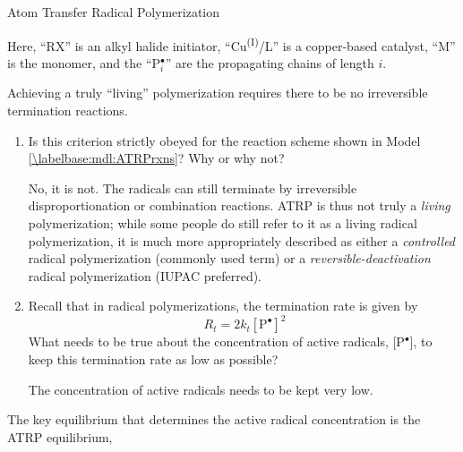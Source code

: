 \begin{activity}{Atom Transfer Radical Polymerization}
\begin{model}
	Here, ``RX'' is an alkyl halide initiator, ``Cu\textsuperscript{(I)}/L'' is a copper-based catalyst, ``M'' is the monomer, and the ``P$_i^\bullet$'' are the propagating chains of length $i$.
	
\end{model}


\begin{ctqs}

	\question Achieving a truly ``living'' polymerization requires there to be no irreversible termination reactions.
	
		\begin{enumerate}
		
			\item Is this criterion strictly obeyed for the reaction scheme shown in Model \ref{\labelbase:mdl:ATRPrxns}?  Why or why not?  \label{\labelbase:ctq:terminationsuprression}
			
				\begin{solution}[1in]
				
					No, it is not.  The radicals can still terminate by irreversible disproportionation or combination reactions.
					ATRP is thus not truly a \emph{living} polymerization; while some people do still refer to it as a living radical polymerization, it is much more appropriately described as either a \emph{controlled} radical polymerization (commonly used term) or a \emph{reversible-deactivation} radical polymerization (IUPAC preferred).
				
				\end{solution}
			
			\item Recall that in radical polymerizations, the termination rate is given by
				\begin{equation*}\
					R_t = 2k_t[\text{P}^\bullet]^2
				\end{equation*}
				What needs to be true about the concentration of active radicals, [P$^\bullet$], to keep this termination rate as low as possible?
				
				\begin{solution}[0.9in]
				
					The concentration of active radicals needs to be kept very low.
				
				\end{solution}
			
		\end{enumerate}
	
	\question The key equilibrium that determines the active radical concentration is the ATRP equilibrium,
	

\end{ctqs}
\end{activity}
